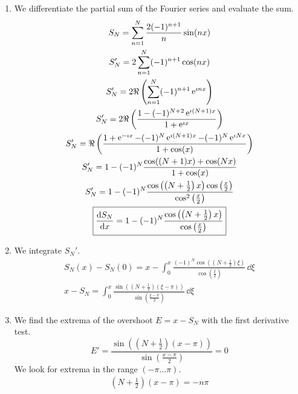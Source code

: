 {\begin{Solution}
  \begin{enumerate}
  \item 
    We differentiate the partial sum of the Fourier series and evaluate the sum.
    \begin{gather*}
      S_N = \sum_{n = 1}^N \frac{2 (-1)^{n+1}}{n} \sin(n x)
      \\
      S_N' = 2 \sum_{n = 1}^N (-1)^{n+1} \cos(n x)
      \\
      S_N' = 2 \Re \left( \sum_{n = 1}^N (-1)^{n+1} \mathop{\mathrm{e}}\nolimits^{\imath n x} \right)
      \\
      S_N' = 2 \Re \left( \frac{ 1 - (-1)^{N+2} \mathop{\mathrm{e}}\nolimits^{\imath (N + 1) x} }{ 1 + \mathop{\mathrm{e}}\nolimits^{\imath x} } \right)
      \\
      S_N' = \Re \left( \frac{ 1 + \mathop{\mathrm{e}}\nolimits^{-\imath x} - (-1)^N \mathop{\mathrm{e}}\nolimits^{\imath (N + 1) x} 
          - (-1)^N \mathop{\mathrm{e}}\nolimits^{\imath N x} }{ 1 + \cos(x) } \right)
      \\
      S_N' = 1 - (-1)^N \frac{ \cos((N + 1) x) + \cos(N x) }
      { 1 + \cos(x) }
      \\
      S_N' = 1 - (-1)^N \frac{ \cos \left( \left( N + \frac{1}{2} \right) x \right)
        \cos \left( \frac{x}{2} \right) }
      { \cos^2 \left( \frac{x}{2} \right) }
      \\
      \boxed{
        \frac{\mathrm{d} S_N}{\mathrm{d} x} = 1 - (-1)^N 
        \frac{ \cos \left( \left( N + \frac{1}{2} \right) x \right) }
        { \cos \left( \frac{x}{2} \right) }
        }
    \end{gather*}
  \item 
    We integrate $S_N'$.
    \begin{gather*}
      S_N(x) - S_N(0) = x 
      - \int_0^x \frac{ (-1)^N \cos \left( \left( N + \frac{1}{2} \right) \xi \right) }
      { \cos \left( \frac{\xi}{2} \right) } \,\dd \xi
      \\
      \boxed{
        x - S_N 
        = \int_0^x \frac{ \sin \left( \left( N + \frac{1}{2} \right)(\xi - \pi) \right) }
        { \sin \left( \frac{\xi - \pi}{2} \right) }\,\dd \xi
        }
    \end{gather*}
  \item 
    We find the extrema of the overshoot $E = x - S_N$ with the first 
    derivative test.
    \[
    E' = \frac{ \sin \left( \left( N + \frac{1}{2} \right)(x - \pi) \right) }
    { \sin \left( \frac{x - \pi}{2} \right) } = 0
    \]
    We look for extrema in the range $(-\pi \ldots \pi)$.
    \begin{gather*}
      \left( N + \frac{1}{2} \right)(x - \pi) = - n \pi

\end{gather*}
\end{enumerate}
\end{Solution}}
